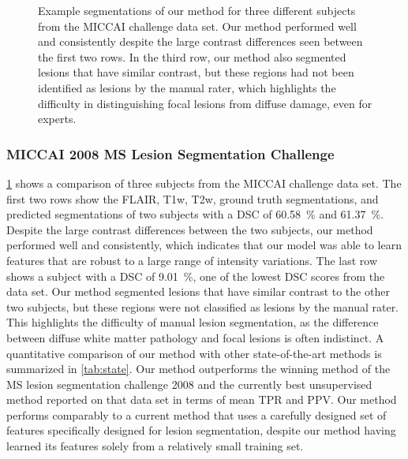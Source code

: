 \begin{figure}[tb]

\caption[Example segmentations of our method for three different subjects from
the MICCAI challenge data set]{Example segmentations of our method for three
different subjects from the MICCAI challenge data set. Our method performed well
and consistently despite the large contrast differences seen between the first
two rows. In the third row, our method also segmented lesions that have similar
contrast, but these regions had not been identified as lesions by the manual
rater, which highlights the difficulty in distinguishing focal lesions from
diffuse damage, even for experts.}

\label{fig:segmentation}
\end{figure}

\subsubsection{MICCAI 2008 MS Lesion Segmentation Challenge}

\ref{fig:segmentation} shows a comparison of three subjects from the MICCAI
challenge data set. The first two rows show the FLAIR, T1w, T2w, ground truth
segmentations, and predicted segmentations of two subjects with a DSC of
\SI{60.58}{\percent} and \SI{61.37}{\percent}. Despite the large contrast
differences between the two subjects, our method performed well and
consistently, which indicates that our model was able to learn features that are
robust to a large range of intensity variations. The last row shows a subject
with a DSC of \SI{9.01}{\percent}, one of the lowest DSC scores from the data
set. Our method segmented lesions that have similar contrast to the other two
subjects, but these regions were not classified as lesions by the manual rater.
This highlights the difficulty of manual lesion segmentation, as the difference
between diffuse white matter pathology and focal lesions is often indistinct. A
quantitative comparison of our method with other state-of-the-art methods is
summarized in \ref{tab:state}. Our method outperforms the winning method
\citep{souplet2008} of the MS lesion segmentation challenge 2008 and the
currently best unsupervised method reported on that data set \citep{weiss2013}
in terms of mean TPR and PPV. Our method performs comparably to a current method
\citep{geremia2010} that uses a carefully designed set of features specifically
designed for lesion segmentation, despite our method having learned its features
solely from a relatively small training set.

